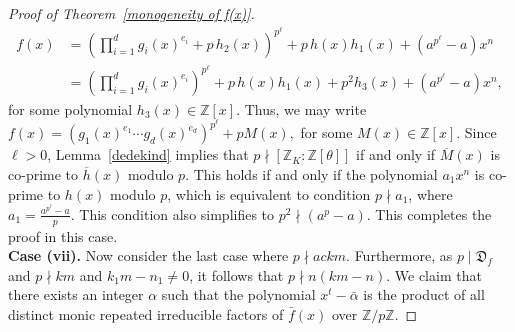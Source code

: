 \documentclass[table]{amsart}
\newcommand{\Z}{\mathbb{Z}}
\newcommand{\D}{\mathfrak{D}}
\numberwithin{equation}{section}
\begin{document}
\begin{proof}[Proof of Theorem~\ref{monogeneity of f(x)}]
\begin{align*}
f(x)
&= \left(\prod_{i=1}^{d} g_{i}(x)^{e_{i}} + p\,h_{2}(x)\right)^{p^{\ell}}
   + p\,h(x)h_{1}(x) + (a^{p^{\ell}}-a)x^{n} \\
&= \left(\prod_{i=1}^{d} g_{i}(x)^{e_{i}}\right)^{p^{\ell}}
   + p\,h(x)h_{1}(x) + p^{2}h_{3}(x) + (a^{p^{\ell}}-a)x^{n},
\end{align*}
for some polynomial $h_{3}(x)\in\mathbb{Z}[x]$. Thus, we may write 
$
f(x)=\left(g_{1}(x)^{e_{1}}\cdots g_{d}(x)^{e_{d}}\right)^{p^{\ell}} + pM(x),
$ for some $M(x)\in\mathbb{Z}[x]$. Since $\ell>0$, Lemma~\ref{dedekind} implies that $p \nmid [\mathbb{Z}_{K}:\mathbb{Z}[\theta]]$ if and only if $\overline{M}(x)$ is co-prime to $\overline{h}(x)$ modulo $p$.
This holds if and only if the polynomial $a_1 x^{n}$ is co-prime to $h(x)$ modulo $p$,
which is equivalent to condition $p\nmid a_1$, where $a_1=\frac{a^{p^{\ell}}-a}{p}.$ This condition also simplifies to $p^{2}\nmid (a^{p}-a)$. This completes the proof in this case.\\[2mm] 
\textbf{Case (vii).} Now consider the last  case where $p \nmid ackm $. Furthermore, as $p\mid \D_f$ and $p\nmid km$ and $k_1m-n_1 \neq 0$, it follows that $p \nmid n(km-n)$. We claim that there exists an integer $\alpha$ such that the polynomial $x^t - \bar{\alpha}$ is the product of all distinct monic repeated irreducible factors of $\bar{f}(x)$ over $\Z/p\Z$. 
	

\end{proof}
\end{document}
